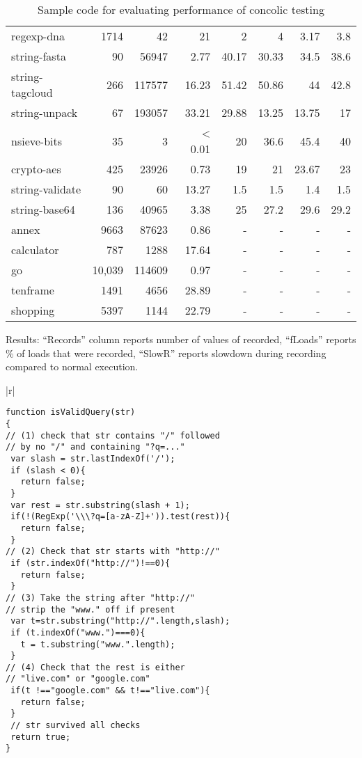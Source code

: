 \documentclass{sig-alternate}
\begin{document}
\begin{table*}
\begin{minipage}{0.6\textwidth}
{\begin{center}
\begin{tabular}{|l|r|r|r|r|r|r|r|}
regexp-dna& 1714 & 42 & 21 & 2 & 4 & 3.17 & 3.8\\
string-fasta& 90 & 56947 & 2.77 & 40.17 & 30.33 & 34.5 & 38.6\\
string-tagcloud& 266 & 117577 & 16.23 & 51.42 & 50.86 & 44 & 42.8\\
string-unpack& 67 & 193057 & 33.21 & 29.88 & 13.25 & 13.75 & 17\\
nsieve-bits& 35 & 3 & < 0.01 & 20 & 36.6 & 45.4 & 40 \\
crypto-aes& 425 & 23926 &0.73  & 19 & 21 & 23.67 & 23 \\
string-validate& 90 & 60 & 13.27 & 1.5 & 1.5 & 1.4 & 1.5\\
string-base64& 136 & 40965 & 3.38 & 25 & 27.2 & 29.6 & 29.2\\
\hline 
annex& 9663 & 87623 & 0.86 & - & - & - & - \\
calculator& 787 & 1288 & 17.64 & - & - & - & - \\
 go& 10,039 & 114609 & 0.97 & - & - & - & - \\
tenframe& 1491 &4656 & 28.89 & - & - & - & - \\
shopping& 5397 & 1144 & 22.79 & - & - & - & - \\
\hline 
\end{tabular}
\end{center}}
\caption{Results: ``Records'' column reports number of values of recorded,
``fLoads'' reports \% of loads that were recorded, ``SlowR'' reports
slowdown during recording compared to normal execution.}
\label{tab:results}
\end{minipage}
\begin{minipage}{0.38\textwidth}
\begin{tabular}{|r|}
\hline\\
{\scriptsize
\begin{lstlisting}[mathescape]
function isValidQuery(str)
{
// (1) check that str contains "/" followed
// by no "/" and containing "?q=..."
 var slash = str.lastIndexOf('/');
 if (slash < 0){
   return false;
 }
 var rest = str.substring(slash + 1);
 if(!(RegExp('\\\?q=[a-zA-Z]+')).test(rest)){
   return false;
 }
// (2) Check that str starts with "http://"
 if (str.indexOf("http://")!==0){
   return false;
 }
// (3) Take the string after "http://"
// strip the "www." off if present
 var t=str.substring("http://".length,slash);
 if (t.indexOf("www.")===0){
   t = t.substring("www.".length);
 }
// (4) Check that the rest is either
// "live.com" or "google.com"
 if(t !=="google.com" && t!=="live.com"){
   return false;
 }
 // str survived all checks
 return true;
}

\end{lstlisting}
}\\
\hline
\end{tabular}
\caption{Sample code for evaluating performance of concolic testing}
\label{tab:conc}
\end{minipage}
\end{table*}
\end{document}
